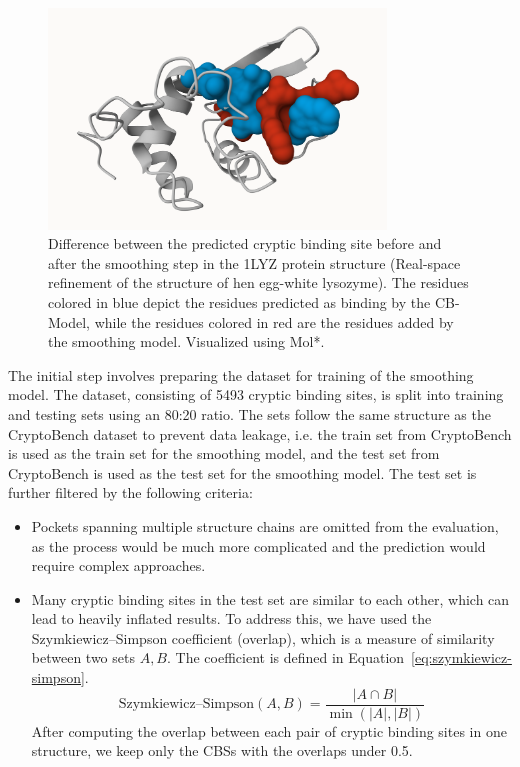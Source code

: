 \begin{figure}
    \centering
    \includegraphics[width=0.8\textwidth]{img/smoothing-difference.png}
    \caption{Difference between the predicted cryptic binding site before and after the smoothing step in the 1LYZ protein structure (Real-space refinement of the structure of hen egg-white lysozyme). The residues colored in blue depict the residues predicted as binding by the CB-Model, while the residues colored in red are the residues added by the smoothing model. Visualized using Mol*.}
    \label{fig:smoothing-difference}
\end{figure}


The initial step involves preparing the dataset for training of the smoothing model. The dataset, consisting of 5493 cryptic binding sites, is split into training and testing sets using an 80:20 ratio. The sets follow the same structure as the CryptoBench dataset to prevent data leakage, i.e. the train set from CryptoBench is used as the train set for the smoothing model, and the test set from CryptoBench is used as the test set for the smoothing model. The test set is further filtered by the following criteria:

\begin{itemize}
    \item Pockets spanning multiple structure chains are omitted from the evaluation, as the process would be much more complicated and the prediction would require complex approaches.
    \item Many cryptic binding sites in the test set are similar to each other, which can lead to heavily inflated results. To address this, we have used the Szymkiewicz–Simpson coefficient (overlap), which is a measure of similarity between two sets $A, B$. The coefficient is defined in Equation~\ref{eq:szymkiewicz-simpson}.
    \begin{equation}
        \text{Szymkiewicz–Simpson}(A, B) = \frac{|A \cap B|}{\min(|A|, |B|)}
        \label{eq:szymkiewicz-simpson}
    \end{equation}
    After computing the overlap between each pair of cryptic binding sites in one structure, we keep only the CBSs with the overlaps under 0.5.
\end{itemize}

